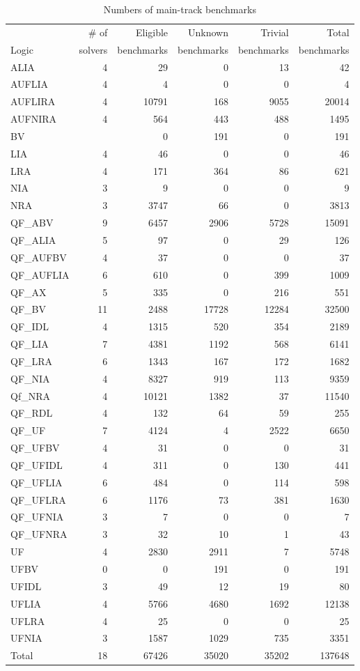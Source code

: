 \documentclass[twosize,11pt]{article}
\begin{document}
\begin{table}
\centering
\begin{tabular}{|l|r|r|r|r|r|}
\hline
       & \# of & Eligible & Unknown  & Trivial  & Total  \\
 Logic & solvers & benchmarks &  benchmarks &  benchmarks &  benchmarks \\
\hline
ALIA & 4 & 29 & 0 & 13 & 42 \\
AUFLIA & 4 & 4 & 0 & 0 & 4\\
AUFLIRA & 4 & 10791 & 168 & 9055 & 20014 \\
AUFNIRA & 4 & 564 & 443 & 488 & 1495 \\
BV &   & 0 & 191 & 0 & 191 \\
LIA & 4 & 46 & 0 & 0 & 46 \\
LRA & 4 & 171 & 364 & 86 & 621\\
NIA & 3 & 9 & 0 & 0 & 9\\
NRA & 3 & 3747 & 66 & 0 & 3813 \\
QF\_ABV & 9 & 6457 & 2906 & 5728 & 15091 \\
QF\_ALIA & 5 & 97 & 0 & 29 & 126 \\
QF\_AUFBV & 4 & 37 & 0 & 0 & 37 \\
QF\_AUFLIA & 6 & 610 & 0 & 399 & 1009\\
QF\_AX & 5 & 335 & 0 & 216 & 551 \\
QF\_BV & 11 & 2488 & 17728 & 12284 & 32500 \\
QF\_IDL & 4 & 1315 & 520 & 354 & 2189 \\
QF\_LIA & 7 & 4381 & 1192 & 568 & 6141 \\
QF\_LRA & 6 & 1343 & 167 & 172 & 1682\\ 
QF\_NIA & 4 & 8327 & 919 & 113 & 9359 \\
Qf\_NRA & 4 & 10121 & 1382 & 37 & 11540 \\
QF\_RDL & 4 & 132 & 64 & 59 & 255 \\
QF\_UF & 7 & 4124 & 4 & 2522 & 6650 \\
QF\_UFBV & 4 & 31 & 0 & 0 & 31 \\
QF\_UFIDL & 4 & 311 & 0 & 130 & 441\\
QF\_UFLIA & 6 & 484 & 0 & 114 & 598 \\
QF\_UFLRA & 6 & 1176 & 73 & 381 & 1630 \\
QF\_UFNIA & 3 & 7 & 0 &0 & 7 \\
QF\_UFNRA & 3 & 32 & 10 & 1 & 43\\
UF & 4 & 2830 & 2911 & 7 & 5748 \\
UFBV & 0 & 0 & 191 & 0 & 191 \\
UFIDL & 3 & 49 & 12 & 19 & 80 \\
UFLIA & 4 & 5766 & 4680 & 1692 & 12138 \\
UFLRA & 4 & 25 & 0 & 0 & 25\\
UFNIA & 3 & 1587 & 1029 & 735 & 3351 \\
\hline
Total & 18 & 67426 & 35020 & 35202 & 137648 \\
\hline
\end{tabular}
\vspace{.2in}
\caption{Numbers of main-track benchmarks}
\label{Table:benchmarks}
\end{table}
\end{document}
